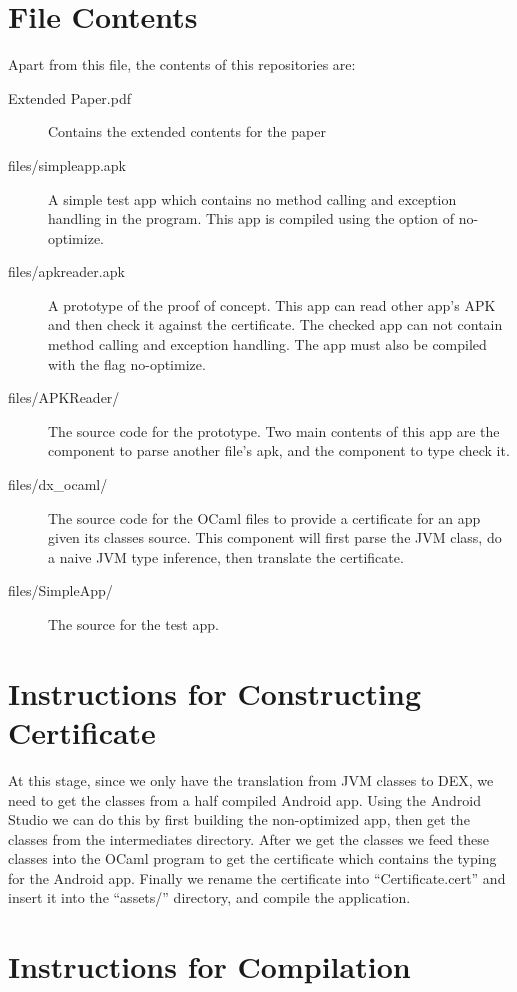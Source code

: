 \documentclass[a4]{article}
\begin{document}
\section{File Contents}
Apart from this file, the contents of this repositories are:
\begin{description}
  \item[Extended Paper.pdf] Contains the extended contents for the paper
  \item[files/simpleapp.apk] A simple test app which contains no method calling and    
    exception handling in the program. This app is compiled using the option of 
    no-optimize.
  \item[files/apkreader.apk] A prototype of the proof of concept. This app can read other
    app's APK and then check it against the certificate. The checked app can not contain
    method calling and exception handling. The app must also be compiled with the flag
    no-optimize.
  \item[files/APKReader/] The source code for the prototype. Two main contents of this
    app are the component to parse another file's apk, and the component to 
    type check it.
  \item[files/dx\_ocaml/] The source code for the OCaml files to provide a certificate
    for an app given its classes source. This component will first parse the JVM class,
    do a naive JVM type inference, then translate the certificate. 
  \item[files/SimpleApp/] The source for the test app.
\end{description}

\section{Instructions for Constructing Certificate}
At this stage, since we only have the translation from JVM classes to DEX, we need to 
get the classes from a half compiled Android app. Using the Android Studio we can do
this by first building the non-optimized app, then get the classes from the 
intermediates directory. After we get the classes we feed these classes into the OCaml
program to get the certificate which contains the typing for the Android app. Finally
we rename the certificate into ``Certificate.cert'' and insert it into the ``assets/''
directory, and compile the application.

\section{Instructions for Compilation}
\end{document}
